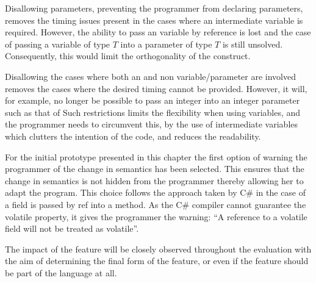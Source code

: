 Disallowing  parameters, preventing the programmer from declaring  parameters, removes the timing issues present in the cases where an intermediate  variable is required. However, the ability to pass an  variable by reference is lost and the case of passing a variable of type  $T$ into a parameter of type $T$ is still unsolved. Consequently, this would limit the orthogonality of the  construct.

Disallowing  the cases where both an  and non  variable/parameter are involved removes the cases where the desired timing cannot be provided. However, it will, for example, no longer be possible to pass an  integer into an  integer parameter such as that of  Such restrictions limits the flexibility when using  variables, and the programmer needs to circumvent this,  by the use of intermediate variables which clutters the intention of the code, and reduces the readability.

For the initial prototype presented in this chapter the first option of warning the programmer of the change in semantics has been selected. This ensures that the change in semantics is not hidden from the programmer thereby allowing her to adapt the program. This choice follows the approach taken by C\# in the case of a  field is passed by ref into a method. As the C\# compiler cannot guarantee the volatile property, it gives the programmer the warning: ``A reference to a volatile field will not be treated as volatile''.

The impact of the feature will be closely observed throughout the evaluation with the aim of determining the final form of the feature, or even if the feature should be part of the language at all.


\worksheetend